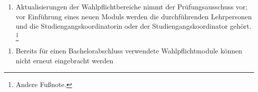 \documentclass{article}\usepackage{helvet}\renewcommand{\familydefault}{\sfdefault}\usepackage[letterpaper,top=2cm,bottom=2cm,left=3cm,right=3cm,marginparwidth=1.75cm]{geometry}\usepackage[colorlinks=true,allcolors=red]{hyperref}\usepackage{enumitem}\usepackage{tabularx}\usepackage[T1]{fontenc}\usepackage[utf8]{inputenc}\usepackage{fancyhdr}\usepackage{lastpage}\pagestyle{fancy}\fancyhf{}
\begin{document}
	\begin{enumerate}[start=4,label=(\arabic*)]
		\item{Aktualisierungen der Wahlpflichtbereiche nimmt der Prüfungsausschuss vor; vor Einführung eines neuen Moduls werden die durchführenden Lehrpersonen und die Studiengangskoordinatorin oder der Studiengangskoordinator gehört. \footnote{\hypertarget{fn2}{}\label{fn2}Andere Fußnote.}}
	\end{enumerate}

	\begin{enumerate}[start=5,label=(\arabic*)]
		\item{Bereits für einen Bachelorabschluss verwendete Wahlpflichtmodule können nicht erneut eingebracht werden}
	\end{enumerate}
\end{document}

